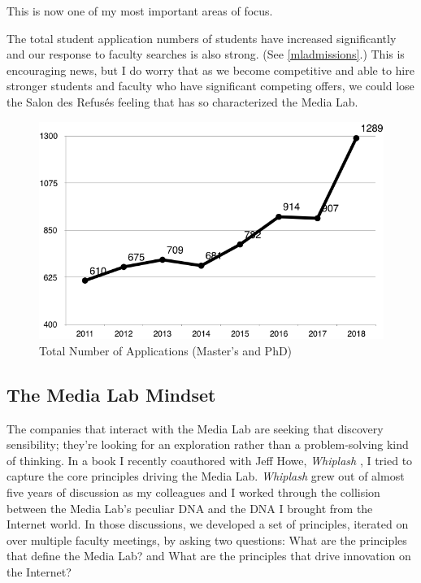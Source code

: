 This is now one of my most important areas of focus.

The total student application numbers of students have increased significantly and our response to faculty searches is also strong. (See \autoref{mladmissions}.) This is encouraging news, but I do worry that as we become competitive and able to hire stronger students and faculty who have significant competing offers, we could lose the Salon des Refusés feeling that has so characterized the Media Lab.

\begin{figure}[h]
 \centering
 \includegraphics[width=1\textwidth]{pictures/2018mladmissions.png}
 \caption{Total Number of Applications (Master's and PhD)}
 \label{mladmissions}
\end{figure}

\subsection{The Media Lab Mindset}

The companies that interact with the Media Lab are seeking that discovery sensibility; they're looking for an exploration rather than a problem-solving kind of thinking. In a book I recently coauthored with Jeff Howe, \emph{Whiplash} \cite{ito2016whiplash}, I tried to capture the core principles driving the Media Lab. \emph{Whiplash} grew out of almost five years of discussion as my colleagues and I worked through the collision between the Media Lab's peculiar DNA and the DNA I brought from the Internet world. In those discussions, we developed a set of principles, iterated on over multiple faculty meetings, by asking two questions: What are the principles that define the Media Lab? and What are the principles that drive innovation on the Internet?

